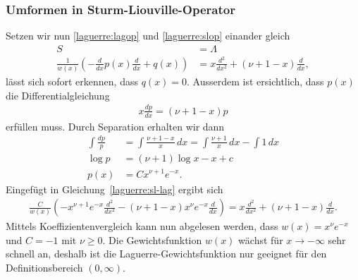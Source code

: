 
\subsubsection{Umformen in Sturm-Liouville-Operator}
Setzen wir nun 
\eqref{laguerre:lagop} und \eqref{laguerre:slop}
einander gleich
\begin{align}
S
 & =
\Lambda
\nonumber
\\
\frac{1}{w(x)} \left(-\frac{d}{dx}p(x) \frac{d}{dx} + q(x) \right)
 & =
x \frac{d^2}{dx^2} + (\nu + 1 - x) \frac{d}{dx}
\label{laguerre:sl-lag}
,
\end{align}
lässt sich sofort erkennen, dass $q(x) = 0$.
Ausserdem ist ersichtlich, dass $p(x)$ die Differentialgleichung
\begin{align*}
x \frac{dp}{dx}
=
(\nu + 1 - x) p
\end{align*}
erfüllen muss.
Durch Separation erhalten wir dann
\begin{align*}
\int \frac{dp}{p}
 & =
\int \frac{\nu + 1 - x}{x} \, dx
=
\int \frac{\nu + 1}{x} \, dx - \int 1\, dx
\\
\log p
 & =
(\nu + 1)\log x - x + c
\\
p(x)
 & =
C x^{\nu + 1} e^{-x}
.
\end{align*}
Eingefügt in Gleichung~\eqref{laguerre:sl-lag} ergibt sich
\begin{align*}
\frac{C}{w(x)}
\left(
-x^{\nu+1} e^{-x} \frac{d^2}{dx^2} -
(\nu + 1 - x) x^{\nu} e^{-x} \frac{d}{dx}
\right)
=
x \frac{d^2}{dx^2} + (\nu + 1 - x) \frac{d}{dx}.
\end{align*}
Mittels Koeffizientenvergleich kann nun abgelesen werden,
dass $w(x) = x^\nu e^{-x}$ und $C=-1$ mit $\nu \geq 0$.
Die Gewichtsfunktion $w(x)$ wächst für $x\rightarrow-\infty$ sehr schnell an,
deshalb ist die Laguerre-Gewichtsfunktion nur geeignet für den
Definitionsbereich $(0, \infty)$.

